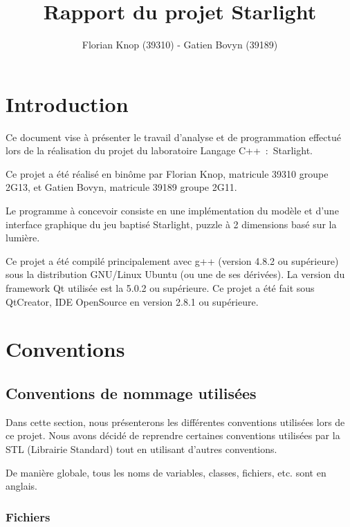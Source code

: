 \documentclass[]{report}
\title{Rapport du projet Starlight}
\author{Florian Knop (39310) - Gatien Bovyn (39189)}
\begin{document}
\lstset{language=C++}  
\maketitle

\newpage

\tableofcontents

\newpage

\section{Introduction}


Ce document vise à présenter le travail d’analyse et de programmation
effectué
lors de la réalisation du projet du laboratoire Langage C++~:~Starlight.

Ce projet a été réalisé en binôme par Florian Knop, matricule 39310 groupe 2G13,
et Gatien Bovyn, matricule 39189 groupe 2G11.

Le programme à concevoir consiste en une implémentation du modèle et d’une interface
graphique du jeu baptisé Starlight, puzzle à 2 dimensions basé sur la lumière.

Ce projet a été compilé principalement avec g++
(version 4.8.2 ou supérieure)
sous la distribution GNU/Linux Ubuntu (ou une de ses dérivées).
La version du framework Qt utilisée est la 5.0.2 ou supérieure.
Ce projet a été fait sous QtCreator, IDE OpenSource en version 2.8.1 ou
supérieure.

\section{Conventions}

\subsection{Conventions de nommage utilisées}

Dans cette section, nous présenterons les différentes conventions 
utilisées lors de ce projet. Nous avons décidé de reprendre certaines
conventions utilisées par la STL (Librairie Standard)
tout en utilisant d'autres conventions.

De manière globale, tous les noms de variables, classes, fichiers, etc.
sont en anglais.

\subsubsection{Fichiers}
\end{document}
